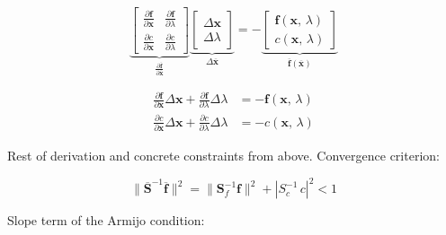 \begin{equation}
\renewcommand{\arraystretch}{1.5}
\underbrace{
\begin{bmatrix}
\frac{\partial\boldsymbol{f}}{\partial\boldsymbol{x}} & \frac{\partial\boldsymbol{f}}{\partial\lambda} \\
\frac{\partial c}{\partial \boldsymbol{x}} &  \frac{\partial c}{\partial \lambda}
\end{bmatrix}
}_{\frac{\partial\overline{\boldsymbol{f}}}{\partial\overline{\boldsymbol{x}}}}
\underbrace{
\begin{bmatrix}
\Delta\boldsymbol{x} \\
\Delta\lambda
\end{bmatrix}
}_{\Delta\overline{\boldsymbol{x}}}
=
-
\underbrace{
\begin{bmatrix}
\boldsymbol{f}(\boldsymbol{x},\,\lambda) \\
c(\boldsymbol{x},\,\lambda)
\end{bmatrix}
}_{\overline{\boldsymbol{f}}(\overline{\boldsymbol{x}})}
\end{equation}

\begin{align}
\frac{\partial\boldsymbol{f}}{\partial\boldsymbol{x}}\Delta\boldsymbol{x} + \frac{\partial\boldsymbol{f}}{\partial\lambda}\Delta\lambda &= -\boldsymbol{f}(\boldsymbol{x},\,\lambda) \\
\frac{\partial c}{\partial\boldsymbol{x}}\Delta\boldsymbol{x} + \frac{\partial c}{\partial\lambda}\Delta\lambda &= -c(\boldsymbol{x},\,\lambda)
\end{align}

Rest of derivation and concrete constraints from above.
Convergence criterion:

\begin{equation}
\lVert \overline{\boldsymbol{S}}^{-1}\overline{\boldsymbol{f}} \rVert^2 = \lVert \boldsymbol{S}_{f}^{-1}\boldsymbol{f} \rVert^2 + |S_{c}^{-1}\,c|^2 < 1
\end{equation}

Slope term of the Armijo condition:

